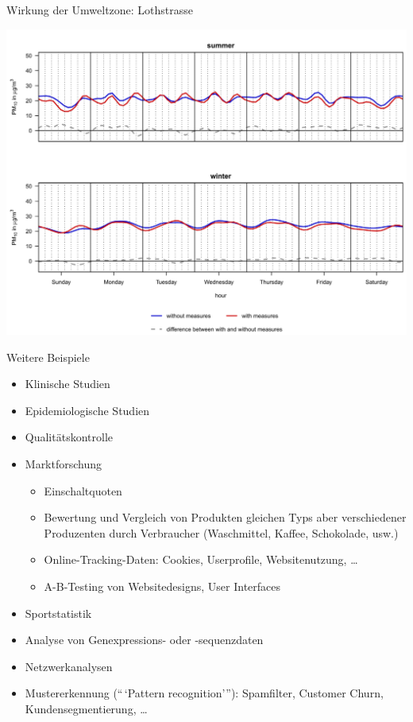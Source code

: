 \documentclass[
  10pt,
  ignorenonframetext,
]{beamer}
\providecommand{\tightlist}{%
  \setlength{\itemsep}{0pt}\setlength{\parskip}{0pt}}
\begin{document}
\begin{frame}{Wirkung der Umweltzone: Lothstrasse}
\label{wirkung-der-umweltzone-lothstrasse}
\begin{center}
\includegraphics[height = .8\textheight]{pics/0-ex6-umweltzone-loth.png}
\end{center}
\end{frame}

\begin{frame}{Weitere Beispiele}
\label{weitere-beispiele}
\begin{itemize}
\tightlist
\item
  Klinische Studien
\item
  Epidemiologische Studien
\item
  Qualitätskontrolle
\item
  Marktforschung

  \begin{itemize}
  \tightlist
  \item
    Einschaltquoten
  \item
    Bewertung und Vergleich von Produkten gleichen Typs aber
    verschiedener Produzenten durch Verbraucher (Waschmittel, Kaffee,
    Schokolade, usw.)
  \item
    Online-Tracking-Daten: Cookies, Userprofile, Websitenutzung,
    \ldots{}
  \item
    A-B-Testing von Websitedesigns, User Interfaces
  \end{itemize}
\item
  Sportstatistik
\item
  Analyse von Genexpressions- oder -sequenzdaten
\item
  Netzwerkanalysen
\item
  Mustererkennung (``\,`Pattern recognition'''): Spamfilter, Customer
  Churn, Kundensegmentierung, \ldots{}
\end{itemize}
\end{frame}
\end{document}
